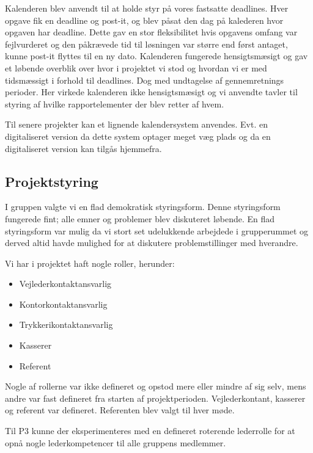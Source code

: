 Kalenderen blev anvendt til at holde styr p\aa{} vores fastsatte deadlines. Hver opgave fik en deadline og post-it, og blev p\aa{}sat den dag p\aa{} kalederen hvor opgaven har deadline. Dette gav en stor fleksibilitet hvis opgavens omfang var fejlvurderet og den p\aa{}kr\ae{}vede tid til l\o{}sningen var st\o{}rre end f\o{}rst antaget, kunne post-it flyttes til en ny dato. 
Kalenderen fungerede hensigtsm\ae{}sigt og gav et l\o{}bende overblik over hvor i projektet vi stod og hvordan vi er med tidsm\ae{}ssigt i forhold til deadlines. 
Dog med undtagelse af gennemretnings perioder. Her virkede kalenderen ikke hensigtsm\ae{}sigt og vi anvendte tavler til styring af hvilke rapportelementer der blev retter af hvem. 

Til senere projekter kan et lignende kalendersystem anvendes. Evt. en digitaliseret version da dette system optager meget v\ae{}g plads og da en digitaliseret version kan tilg\aa{}s hjemmefra. 

\subsection{Projektstyring}
I gruppen valgte vi en flad demokratisk styringsform. Denne styringsform fungerede fint; alle emner og problemer blev diskuteret l\o{}bende. En flad styringsform var mulig da vi stort set udelukkende arbejdede i grupperummet og derved altid havde mulighed for at diskutere problemstillinger med hverandre. 

Vi har i projektet haft nogle roller, herunder:
\begin{itemize}
\item Vejlederkontaktansvarlig
\item Kontorkontaktansvarlig
\item Trykkerikontaktansvarlig
\item Kasserer
\item Referent
\end{itemize}
Nogle af rollerne var ikke defineret og opstod mere eller mindre af sig selv, mens andre var fast defineret fra starten af projektperioden. Vejlederkontant, kasserer og referent var defineret. Referenten blev valgt til hver m\o{}de. 

Til P3 kunne der eksperimenteres med en defineret roterende lederrolle for at opn\aa{} nogle lederkompetencer til alle gruppens medlemmer. 






